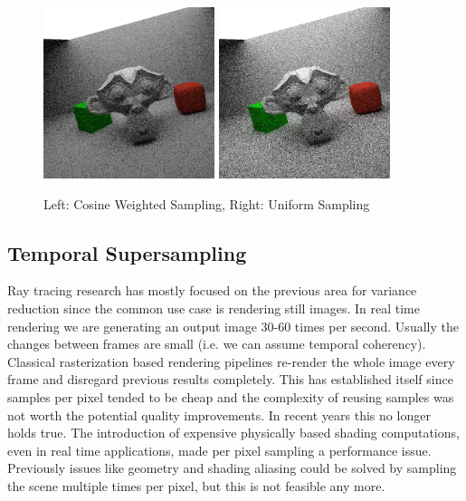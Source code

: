 \documentclass{ACGSeminar}
\begin{document}
\begin{figure}[htb!]

  \centering
  \includegraphics[width=5cm,natwidth=512,natheight=512]{figures/50_spp_cosine_weighted.png}
  \includegraphics[width=5cm,natwidth=512,natheight=512]{figures/50_spp_uniform.png}
  \caption{Left: Cosine Weighted Sampling, Right: Uniform Sampling}
  \label{fig:rendering-cos-weighted}
\end{figure}

\subsection{Temporal Supersampling}
Ray tracing research has mostly focused on the previous area for variance reduction since the common use case is rendering still images.
In real time rendering we are generating an output image 30-60 times per second. Usually the changes between frames are small (i.e. we can assume temporal coherency). Classical rasterization based rendering pipelines re-render the whole image every frame and disregard previous results completely. This has established itself since samples per pixel tended to be cheap and the complexity of reusing samples was not worth the potential quality improvements.
In recent years this no longer holds true. The introduction of expensive physically based shading computations, even in real time applications, made per pixel sampling a performance issue. Previously issues like geometry and shading aliasing could be solved by sampling the scene multiple times per pixel, but this is not feasible any more.
\end{document}
